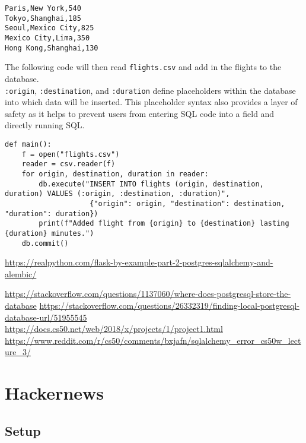 \documentclass[]{book}
\begin{document}
\begin{verbatim}
Paris,New York,540    
Tokyo,Shanghai,185    
Seoul,Mexico City,825 
Mexico City,Lima,350  
Hong Kong,Shanghai,130
\end{verbatim}

The following code will then read \texttt{flights.csv} and add in the
flights to the database.\\
\texttt{:origin}, \texttt{:destination}, and \texttt{:duration} define
placeholders within the database into which data will be inserted. This
placeholder syntax also provides a layer of safety as it helps to
prevent users from entering SQL code into a field and directly running
SQL.

\begin{verbatim}
def main():
    f = open("flights.csv")                                                                                        
    reader = csv.reader(f)                                                                                         
    for origin, destination, duration in reader:                                                                   
        db.execute("INSERT INTO flights (origin, destination, duration) VALUES (:origin, :destination, :duration)",
                    {"origin": origin, "destination": destination, "duration": duration})                          
        print(f"Added flight from {origin} to {destination} lasting {duration} minutes.")                          
    db.commit()                                                                                                    
\end{verbatim}

\url{https://realpython.com/flask-by-example-part-2-postgres-sqlalchemy-and-alembic/}

\url{https://stackoverflow.com/questions/1137060/where-does-postgresql-store-the-database}
\url{https://stackoverflow.com/questions/26332319/finding-local-postgresql-database-url/51955545}
\url{https://docs.cs50.net/web/2018/x/projects/1/project1.html}
\url{https://www.reddit.com/r/cs50/comments/bxjafn/sqlalchemy_error_cs50w_lecture_3/}

\chapter{Hackernews}\label{hackernews}

\section{Setup}\label{setup-1}
\end{document}
